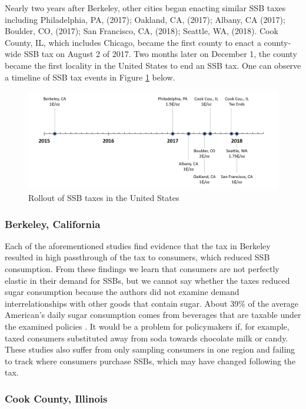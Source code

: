 \documentclass[12pt]{article}
\begin{document}
Nearly two years after Berkeley, other cities began enacting similar SSB taxes including Philadelphia, PA, (2017); Oakland, CA, (2017); Albany, CA (2017); Boulder, CO, (2017); San Francisco, CA, (2018); Seattle, WA, (2018). Cook County, IL, which includes Chicago, became the first county to enact a county-wide SSB tax on August 2 of 2017. Two months later on December 1, the county became the first locality in the United States to end an SSB tax. One can observe a timeline of SSB tax events in Figure \ref{taxtimeline} below.

\begin{figure}[t]\centering
\includegraphics[width = \textwidth]{../figures/taxtimeline.png}
\caption{Rollout of SSB taxes in the United States \label{taxtimeline}}
\end{figure}

\subsubsection{Berkeley, California}

Each of the aforementioned studies find evidence that the tax in Berkeley resulted in high passthrough of the tax to consumers, which reduced SSB consumption. From these findings we learn that consumers are not perfectly elastic in their demand for SSBs, but we cannot say whether the taxes reduced sugar consumption because the authors did not examine demand interrelationships with other goods that contain sugar. About 39\% of the average American's daily sugar consumption comes from beverages that are taxable under the examined policies \parencite{dietary2015dietary}. It would be a problem for policymakers if, for example, taxed consumers substituted away from soda towards chocolate milk or candy. These studies also suffer from only sampling consumers in one region and failing to track where consumers purchase SSBs, which may have changed following the tax.

\subsubsection{Cook County, Illinois}
\end{document}
